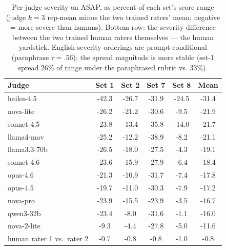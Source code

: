 \begin{table}[t]\centering\caption{Per-judge severity on ASAP, as percent of each set's score range (judge $k{=}3$ rep-mean minus the two trained raters' mean; negative = more severe than humans). Bottom row: the severity difference between the two trained human raters themselves --- the human yardstick. English severity orderings are prompt-conditional (paraphrase $\tau = .56$); the spread magnitude is more stable (set-1 spread 26\% of range under the paraphrased rubric vs. 33\%).}
\label{tab:asapsev}\small\begin{tabular}{lccccc}\toprule
Judge & Set 1 & Set 2 & Set 7 & Set 8 & Mean \\ \midrule
haiku-4.5 & -42.3 & -26.7 & -31.9 & -24.5 & -31.4 \\
nova-lite & -26.2 & -21.2 & -30.6 & -9.5 & -21.9 \\
sonnet-4.5 & -23.8 & -13.4 & -35.8 & -14.0 & -21.7 \\
llama4-mav & -25.2 & -12.2 & -38.9 & -8.2 & -21.1 \\
llama3.3-70b & -26.5 & -18.0 & -27.5 & -4.3 & -19.1 \\
sonnet-4.6 & -23.6 & -15.9 & -27.9 & -6.4 & -18.4 \\
opus-4.6 & -21.3 & -10.9 & -31.7 & -7.4 & -17.8 \\
opus-4.5 & -19.7 & -11.0 & -30.3 & -7.9 & -17.2 \\
nova-pro & -23.9 & -15.5 & -23.9 & -3.5 & -16.7 \\
qwen3-32b & -23.4 & -8.0 & -31.6 & -1.1 & -16.0 \\
nova-2-lite & -9.3 & -4.4 & -27.8 & -5.0 & -11.6 \\
\midrule
human rater 1 vs.\ rater 2 & -0.7 & -0.8 & -0.8 & -1.0 & -0.8 \\
\bottomrule\end{tabular}\end{table}
